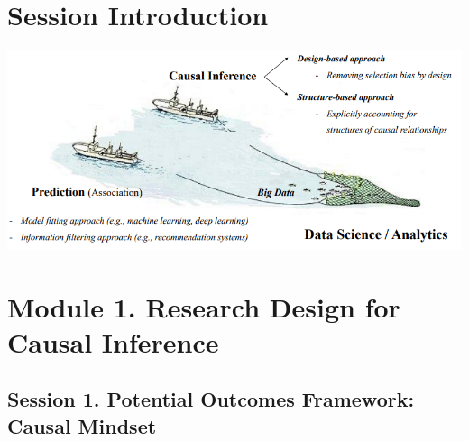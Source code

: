 \documentclass[
]{book}
\theoremstyle{definition}
\theoremstyle{definition}
\theoremstyle{definition}
\theoremstyle{definition}
\theoremstyle{remark}
\begin{document}
\hypertarget{session-introduction}{%
\section{Session Introduction}\label{session-introduction}}

\includegraphics{figures/50.png}

\hypertarget{module-1.-research-design-for-causal-inference}{%
\section{Module 1. Research Design for Causal Inference}\label{module-1.-research-design-for-causal-inference}}

\hypertarget{session-1.-potential-outcomes-framework-causal-mindset}{%
\subsection{Session 1. Potential Outcomes Framework: Causal Mindset}\label{session-1.-potential-outcomes-framework-causal-mindset}}
\end{document}
